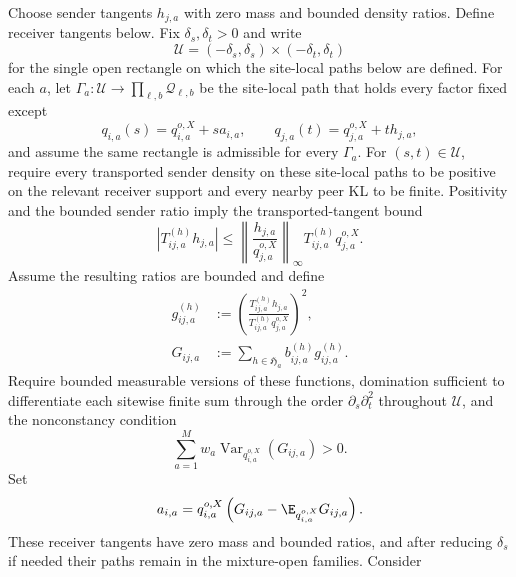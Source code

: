 Choose sender tangents \(h_{j,a}\) with zero mass and bounded density ratios. Define receiver tangents below. Fix \(\delta_s,\delta_t>0\) and write
\begin{equation}
\mathcal U=(-\delta_s,\delta_s)\times(-\delta_t,\delta_t)
\label{eq:moving-peer-admissible-rectangle}
\end{equation}
for the single open rectangle on which the site-local paths below are defined.
For each \(a\), let \(\Gamma_a:\mathcal U\to\prod_{\ell,b}\mathcal Q_{\ell,b}\) be the site-local path that holds every factor fixed except
\begin{equation}
q_{i,a}(s)=q_{i,a}^{o,X}+s a_{i,a},
\qquad
q_{j,a}(t)=q_{j,a}^{o,X}+t h_{j,a},
\label{eq:moving-peer-finite-paths}
\end{equation}
and assume the same rectangle is admissible for every \(\Gamma_a\). For \((s,t)\in\mathcal U\), require every transported sender density on these site-local paths to be positive on the relevant receiver support and every nearby peer KL to be finite. Positivity and the bounded sender ratio imply the transported-tangent bound
\begin{equation}
\left|T_{ij,a}^{(h)}h_{j,a}\right|
\leq
\left\lVert\frac{h_{j,a}}{q_{j,a}^{o,X}}\right\rVert_\infty
T_{ij,a}^{(h)}q_{j,a}^{o,X}.
\label{eq:moving-peer-transported-tangent-bound}
\end{equation}
Assume the resulting ratios are bounded and define
\begin{align}
g_{ij,a}^{(h)}
&:=\left(
\frac{T_{ij,a}^{(h)}h_{j,a}}
{T_{ij,a}^{(h)}q_{j,a}^{o,X}}
\right)^2,
\label{eq:moving-peer-g-definition}\\
G_{ij,a}
&:=\sum_{h\in\mathfrak H_a}b_{ij,a}^{(h)}g_{ij,a}^{(h)}.
\label{eq:moving-peer-aggregate-definition}
\end{align}
Require bounded measurable versions of these functions, domination sufficient to differentiate each sitewise finite sum through the order \(\partial_s\partial_t^2\) throughout \(\mathcal U\), and the nonconstancy condition
\begin{equation}
\sum_{a=1}^{M}w_a
\operatorname{Var}_{q_{i,a}^{o,X}}(G_{ij,a})>0.
\label{eq:moving-peer-finite-positive-variance}
\end{equation}
Set
\begin{equation}
a_{i,a}=q_{i,a}^{o,X}
\left(G_{ij,a}-\E_{q_{i,a}^{o,X}}G_{ij,a}\right).
\label{eq:moving-peer-receiver-tangent}
\end{equation}
These receiver tangents have zero mass and bounded ratios, and after reducing \(\delta_s\) if needed their paths remain in the mixture-open families. Consider
